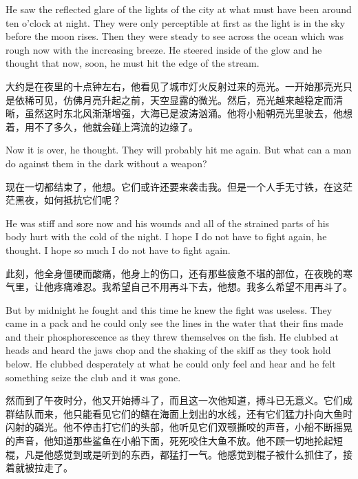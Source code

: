 \begin{paracol}{2}
\switchcolumn*

He saw the \gls{reflected} glare of the lights of the city at what must have
been around ten o'clock at night. They were only \gls{perceptible} at first
as the light is in the sky before the moon rises. Then they were steady to
see across the ocean which was rough now with the increasing breeze. He
steered inside of the glow and he thought that now, soon, he must hit the
edge of the stream.

\switchcolumn

大约是在夜里的十点钟左右，他看见了城市灯火反射过来的亮光。一开始那亮光只是依稀可见，仿佛月亮升起之前，天空显露的微光。然后，亮光越来越稳定而清晰，虽然这时东北风渐渐增强，大海已是波涛汹涌。他将小船朝亮光里驶去，他想着，用不了多久，他就会碰上湾流的边缘了。

\switchcolumn*

Now it is over, he thought. They will probably hit me again. But what can a
man do against them in the dark without a weapon?

\switchcolumn

现在一切都结束了，他想。它们或许还要来袭击我。但是一个人手无寸铁，在这茫茫黑夜，如何抵抗它们呢？

\switchcolumn*

He was stiff and sore now and his wounds and all of the \gls{strained}
parts of his body hurt with the cold of the night. I hope I do not have to
fight again, he thought. I hope so much I do not have to fight again.

\switchcolumn

此刻，他全身僵硬而酸痛，他身上的伤口，还有那些疲惫不堪的部位，在夜晚的寒气里，让他疼痛难忍。我希望自己不用再斗下去，他想。我多么希望不用再斗了。

\switchcolumn*

But by midnight he fought and this time he knew the fight was \gls{useless}.
They came in a pack and he could only see the lines in the water that their
fins made and their phosphorescence as they threw themselves on the fish. He
clubbed at heads and heard the jaws chop and the shaking of the skiff as
they took hold below. He clubbed desperately at what he could only feel and
hear and he felt something \gls{seize} the club and it was gone.

\switchcolumn

然而到了午夜时分，他又开始搏斗了，而且这一次他知道，搏斗已无意义。它们成群结队而来，他只能看见它们的鳍在海面上划出的水线，还有它们猛力扑向大鱼时闪射的磷光。他不停击打它们的头部，他听见它们双颚撕咬的声音，小船不断摇晃的声音，他知道那些鲨鱼在小船下面，死死咬住大鱼不放。他不顾一切地抡起短棍，凡是他感觉到或是听到的东西，都猛打一气。他感觉到棍子被什么抓住了，接着就被拉走了。


\end{paracol}
